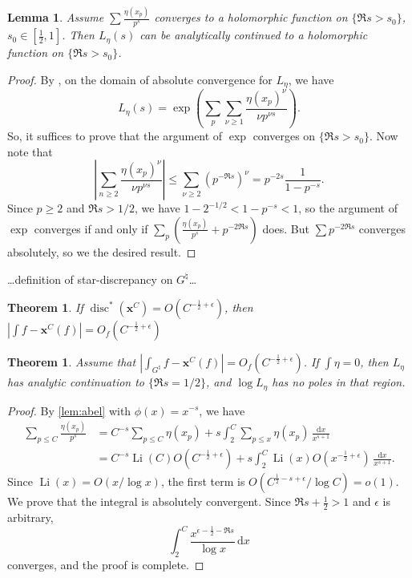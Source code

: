 \documentclass{article}
\DeclareMathOperator{\disc}{disc}
\DeclareMathOperator{\Li}{Li}
\newcommand{\bx}{\boldsymbol{x}}
\newcommand{\dd}{\mathrm{d}}
\newtheorem{theorem}[subsection]{Theorem}
\newtheorem{lemma}[subsection]{Lemma}
\theoremstyle{definition}
\begin{document}
\begin{lemma}
Assume $\sum \frac{\eta(x_p)}{p^s}$ converges to a holomorphic function on  
$\{\Re s>s_0\}$, $s_0\in \left[\frac 1 2, 1\right]$. Then $L_\eta(s)$ can be 
analytically continued to a holomorphic function on $\{\Re s > s_0\}$. 
\end{lemma}
\begin{proof}
By \cite[11.9, Ex.~2]{apostol-1976}, on the domain of absolute convergence for 
$L_\eta$, we have 
\[
	L_\eta(s) = \exp\left(\sum_p \sum_{\nu\geqslant 1} \frac{\eta(x_p)^\nu}{\nu p^{\nu s}}\right) .
\]
So, it suffices to prove that the argument of $\exp$ converges on 
$\{\Re s>s_0\}$. Now note that 
\[
	\left|\sum_{n\geqslant 2} \frac{\eta(x_p)^\nu}{\nu p^{\nu s}}\right|
		\leqslant \sum_{\nu\geqslant 2} (p^{-\Re s})^\nu 
		= p^{-2 s} \frac{1}{1-p^{-s}} .
\]
Since $p\geqslant 2$ and $\Re s>1/2$, we have $1-2^{-1/2}<1-p^{-s}<1$, so the 
argument of $\exp$ converges if and only if 
$\sum_p \left(\frac{\eta(x_p)}{p^s} + p^{-2\Re s}\right)$ does. But 
$\sum p^{-2\Re s}$ converges absolutely, so we the desired result. 
\end{proof}

\ldots definition of star-discrepancy on $G^\natural$\ldots

\begin{theorem}
If $\disc^\ast(\bx^C) = O(C^{-\frac 1 2+\epsilon})$, then 
$\left|\int f - \bx^C(f)\right| = O_f(C^{-\frac 1 2+\epsilon})$
\end{theorem}

\begin{theorem}
Assume that $\left|\int_{G^\natural} f - \bx^C(f)\right| = O_f(C^{-\frac 1 2+\epsilon})$. 
If $\int \eta = 0$, then $L_\eta$ has analytic continuation to $\{\Re s=1/2\}$, and 
$\log L_\eta$ has no poles in that region. 

\end{theorem}
\begin{proof}
By \autoref{lem:abel} with $\phi(x)=x^{-s}$, we have 
\begin{align*}
	\sum_{p\leqslant C} \frac{\eta(x_p)}{p^s} 
		&= C^{-s} \sum_{p\leqslant C} \eta(x_p) + s \int_2^C \sum_{p\leqslant x} \eta(x_p)\, \frac{\dd x}{x^{s+1}} \\
		&= C^{-s}\Li(C) O(C^{-\frac 1 2+\epsilon}) + s \int_2^C \Li(x) O(x^{-\frac 1 2+\epsilon})\, \frac{\dd x}{x^{s+1}} .
\end{align*}
Since $\Li(x)=O(x/\log x)$, the first term is 
$O(C^{\frac 1 2 -s+\epsilon}/\log C) = o(1)$. We prove that the integral is 
absolutely convergent. Since $\Re s+\frac 1 2>1$ and $\epsilon$ is arbitrary, 
\[
	\int_2^C \frac{x^{\epsilon-\frac 1 2-\Re s}}{\log x}\, \dd x
\]
converges, and the proof is complete. 
\end{proof}
\end{document}
